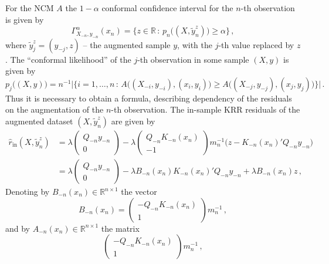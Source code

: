 \documentclass[a4paper,14pt]{article}
\newcommand{\Real}{\mathbb{R}}
\begin{document}
For the NCM $A$ the $1-\alpha$ conformal confidence interval for the $n$-th observation
is given by
$$ \Gamma_{X_{-n}, y_{-n}}^\alpha (x_n)
  = \bigl\{ z\in \Real \,:\, p_n\bigl((X, \tilde{y}_n^z)\bigr) \geq \alpha \bigr\}
  \,, $$
where $\tilde{y}_j^z = (y_{-j}, z)$ -- the augmented sample $y$, with the $j$-th
value replaced by $z$. The ``conformal likelihood'' of the $j$-th observation in
some sample $(X, y)$ is given by
$$ p_j\bigl((X, y)\bigr)
  = n^{-1} \bigl\lvert \bigl\{ i = 1,\ldots, n \, : \,
      A\bigl((X_{-i}, y_{-i}), (x_i, y_i)\bigr)
      \geq A\bigl((X_{-j}, y_{-j}), (x_j, y_j)\bigr)
    \bigr\} \bigr\rvert
  \,. $$
Thus it is necessary to obtain a formula, describing dependency of the residuals on
the augmentation of the $n$-th observation. The in-sample KRR residuals of the augmented
dataset $(X, \tilde{y}_n^z)$ are given by
\begin{align}
    \hat{r}_{\text{in}}(X, \tilde{y}_n^z)
    &= \lambda \begin{pmatrix} Q_{-n} y_{-n} \\ 0 \end{pmatrix}
     - \lambda \begin{pmatrix} Q_{-n} K_{-n}(x_n) \\ -1 \end{pmatrix}
       m_n^{-1} \bigl(z - K_{-n}(x_n)' Q_{-n} y_{-n} \bigr) \label{eq:krr_in_resid} \\
    &= \lambda \begin{pmatrix} Q_{-n} y_{-n} \\ 0 \end{pmatrix}
     - \lambda B_{-n}(x_n) K_{-n}(x_n)' Q_{-n} y_{-n}
     + \lambda B_{-n}(x_n) z\,,
\end{align}
Denoting by $B_{-n}(x_n)\in\Real^{n\times 1}$ the vector
$$ B_{-n}(x_n) = \begin{pmatrix} - Q_{-n} K_{-n}(x_n) \\ 1 \end{pmatrix} m_n^{-1} \,, $$
and by $A_{-n}(x_n)\in\Real^{n\times 1}$ the matrix
$$ \begin{pmatrix} - Q_{-n} K_{-n}(x_n) \\ 1 \end{pmatrix} m_n^{-1} \,, $$
\end{document}
